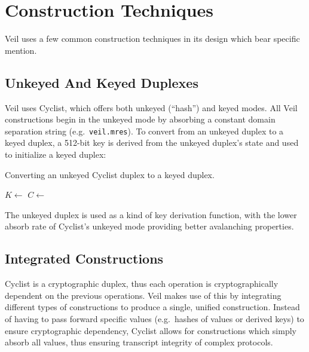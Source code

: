 \section{Construction Techniques}\label{sec:construction-techniques}

Veil uses a few common construction techniques in its design which bear specific mention.

\subsection{Unkeyed And Keyed Duplexes}\label{subsec:cons-keyed-duplexes}

Veil uses Cyclist, which offers both unkeyed \@(``hash'') and keyed modes.
All Veil constructions begin in the unkeyed mode by absorbing a constant domain separation string
(e.g.\ \texttt{veil.mres}).
To convert from an unkeyed duplex to a keyed duplex, a 512-bit key is derived from the unkeyed
duplex's state and used to initialize a keyed duplex:

\begin{algorithm}[ht]
    \caption{Converting an unkeyed Cyclist duplex to a keyed duplex.}
    \begin{algorithmic}
        \State {}
        \State {}
        \State $K \gets $ 
        \State {}
        \State $C \gets $ 
    \end{algorithmic}
    \label{alg:duplex-convert}
\end{algorithm}

The unkeyed duplex is used as a kind of key derivation function, with the lower absorb rate of
Cyclist's unkeyed mode providing better avalanching properties.

\subsection{Integrated Constructions}\label{subsec:cons-integrated-constructions}

Cyclist is a cryptographic duplex, thus each operation is cryptographically dependent on the
previous operations.
Veil makes use of this by integrating different types of constructions to produce a single, unified
construction.
Instead of having to pass forward specific values \@(e.g.\ hashes of values or derived keys) to
ensure cryptographic dependency, Cyclist allows for constructions which simply absorb all values,
thus ensuring transcript integrity of complex protocols.

